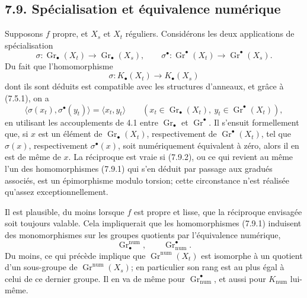 \documentclass[11pt]{article}
\newcommand{\Gr}{\operatorname{Gr}}
\providecommand{\Gr}{\operatorname{Gr}}
\providecommand{\Gr}{\operatorname{G}}
\begin{document}
\subsection*{7.9. Spécialisation et équivalence numérique}
Supposons \(f\) propre, et \(X_s\) et \(X_t\) réguliers. Considérons les deux applications de spécialisation
\begin{equation}\tag{7.9.1}
  \sigma:\Gr_\bullet(X_t)\longrightarrow\Gr_\bullet(X_s),
  \qquad
  \sigma^\bullet:\Gr^\bullet(X_t)\longrightarrow\Gr^\bullet(X_s).
\end{equation}
Du fait que l'homomorphisme
\begin{equation}\tag{7.9.2}
  \sigma:K_\bullet(X_t)\longrightarrow K_\bullet(X_s)
\end{equation}
dont ils sont déduits est compatible avec les structures d'anneaux, et grâce à (7.5.1), on a
\[
  \langle\sigma(x_t),\sigma^\bullet(y_t)\rangle
  =
  \langle x_t,y_t\rangle
  \qquad
  (x_t\in\Gr_\bullet(X_t),\ y_t\in\Gr^\bullet(X_t)),
\tag{7.9.3}
\]
en utilisant les accouplements de 4.1 entre \(\Gr_\bullet\) et \(\Gr^\bullet\). Il s'ensuit formellement que, si \(x\) est un élément de \(\Gr_\bullet(X_t)\), respectivement de \(\Gr^\bullet(X_t)\), tel que \(\sigma(x)\), respectivement \(\sigma^\bullet(x)\), soit numériquement équivalent à zéro, alors il en est de même de \(x\). La réciproque est vraie si (7.9.2), ou ce qui revient au même l'un des homomorphismes (7.9.1) qui s'en déduit par passage aux gradués associés, est un épimorphisme modulo torsion; cette circonstance n'est réalisée qu'assez exceptionnellement.

Il est plausible, du moins lorsque \(f\) est propre et lisse, que la réciproque envisagée soit toujours valable. Cela impliquerait que les homomorphismes (7.9.1) induisent des monomorphismes sur les groupes quotients par l'équivalence numérique,
\[
  \Gr^{\mathrm{num}}_\bullet,\qquad
  \Gr_{\mathrm{num}}^\bullet.
\]
Du moins, ce qui précède implique que \(\Gr^{\mathrm{num}}(X_t)\) est isomorphe à un quotient d'un sous-groupe de \(\Gr^{\mathrm{num}}(X_s)\); en particulier son rang est au plus égal à celui de ce dernier groupe. Il en va de même pour \(\Gr_{\mathrm{num}}^\bullet\), et aussi pour \(K_{\mathrm{num}}\) lui-même.
\end{document}
